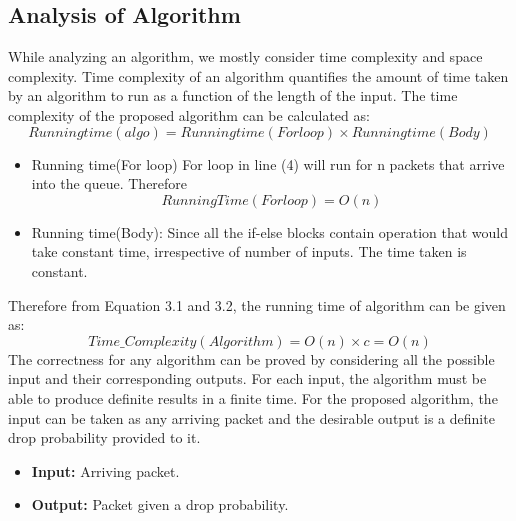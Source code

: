 \subsection{Analysis of Algorithm}
While analyzing an algorithm, we mostly consider time complexity and space complexity. Time complexity of an algorithm quantifies the amount of time taken by an algorithm to run as a function of the length of the input. The time complexity of the proposed algorithm can be calculated as:
\begin{equation}
Running time(algo)= Running time(For loop) \times Running time(Body)   
\end{equation}
\begin{itemize}
    \item Running time(For loop)
    \newline For loop in line (4) will run for n packets that arrive into the queue. Therefore 
    \begin{equation}
     RunningTime(For loop)=O(n)  
    \end{equation}
    \item Running time(Body): Since all the if-else blocks contain operation that would take constant time, irrespective of number of inputs. The time taken is constant. 
\end{itemize}       
Therefore from Equation 3.1 and 3.2, the running time of algorithm can be given as:
\begin{equation}
    Time\_Complexity(Algorithm) = O(n) \times c = O(n)
\end{equation}
The correctness for any algorithm can be proved by considering all the possible input and their corresponding outputs. For each input, the algorithm must be able to produce definite results in a finite time. For the proposed algorithm, the input can be taken as any arriving packet and the desirable output is a definite drop probability provided to it. 
\begin{itemize}
    \item {\bf Input:} Arriving packet.
    \item {\bf Output:} Packet given a drop probability.
\end{itemize}
